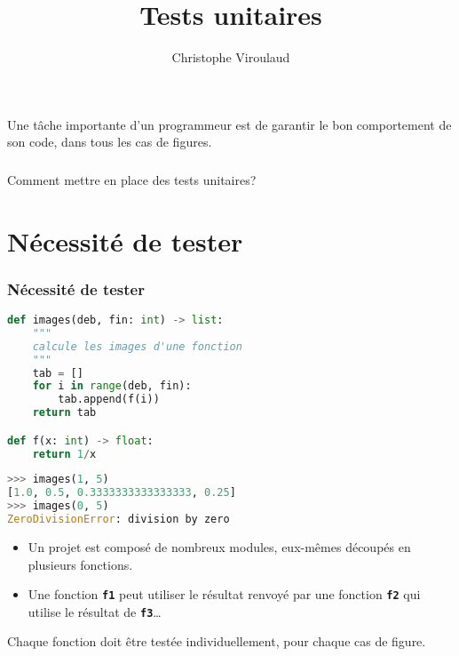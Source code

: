\documentclass[svgnames,11pt]{beamer}
\author[]{Christophe Viroulaud}
\title{Tests unitaires}
\date{\framebox{\textbf{Algo 16}}}
\institute{Terminale - NSI}
\begin{document}
\begin{frame}
    \titlepage
\end{frame}
\begin{frame}
    \frametitle{}

    Une tâche importante d'un programmeur est de garantir le bon comportement de son code, dans tous les cas de figures.

\end{frame}
\begin{frame}
    \frametitle{}

    \begin{framed}
        \centering Comment mettre en place des tests unitaires?
    \end{framed}

\end{frame}
\section{Nécessité de tester}
\begin{frame}[fragile]
    \frametitle{Nécessité de tester}

    \begin{center}
        \begin{lstlisting}[language=Python , basicstyle=\ttfamily\small, xleftmargin=2em, xrightmargin=2em]
def images(deb, fin: int) -> list:
    """
    calcule les images d'une fonction
    """
    tab = []
    for i in range(deb, fin):
        tab.append(f(i))
    return tab

def f(x: int) -> float:
    return 1/x
\end{lstlisting}
        \begin{lstlisting}[language=Python , basicstyle=\ttfamily\small, xleftmargin=2em, xrightmargin=2em]
>>> images(1, 5)
[1.0, 0.5, 0.3333333333333333, 0.25]
>>> images(0, 5)
ZeroDivisionError: division by zero
\end{lstlisting}
    \end{center}

\end{frame}
\begin{frame}
    \begin{itemize}
        \item Un projet est composé de nombreux modules, eux-mêmes découpés en plusieurs fonctions.
        \item Une fonction \textbf{\texttt{f1}} peut utiliser le résultat renvoyé par une fonction \textbf{\texttt{f2}} qui utilise le résultat de \textbf{\texttt{f3}}\dots
    \end{itemize}

    \begin{aretenir}[]
        Chaque fonction doit être testée individuellement, pour chaque cas de figure.
    \end{aretenir}

\end{frame}
\end{document}
